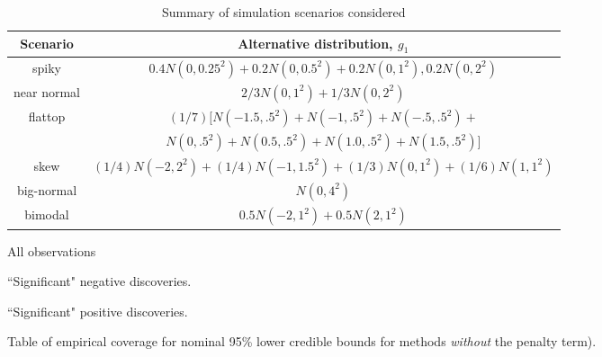 \documentclass[11pt]{article}
\begin{document}
\begin{table}[!ht]
\centering\begin{tabular}{c c } \toprule
Scenario & Alternative distribution, $g_1$  \\ \midrule
spiky & $0.4 N(0,0.25^2) + 0.2 N(0,0.5^2) + 0.2 N(0,1^2), 0.2 N(0,2^2) $\\
near normal & $2/3 N(0,1^2) + 1/3 N(0,2^2)$ \\
flattop& $(1/7) [N(-1.5,.5^2) + N(-1,.5^2) + N(-.5,.5^2) +$ \\
 &  $N(0,.5^2) +N(0.5,.5^2)  +N(1.0,.5^2) + N(1.5,.5^2)]$  \\
skew & $(1/4) N(-2,2^2) + (1/4) N(-1,1.5^2) +  (1/3) N(0,1^2) + (1/6) N(1,1^2) $\\
big-normal & $N(0,4^2)$ \\ 
bimodal & $0.5 N(-2,1^2) + 0.5 N(2,1^2)$ \\ \bottomrule
\end{tabular}
\caption{Summary of simulation scenarios considered} \label{table:scenarios}
\end{table}


\begin{table}[!ht]
\begin{subtable}{\textwidth}
	\centering
	\caption{All observations}
\end{subtable}

\begin{subtable}{\textwidth}
\centering
\caption{``Significant" negative discoveries.}
\end{subtable}

\begin{subtable}{\textwidth}
\centering
\caption{``Significant" positive discoveries.}
\end{subtable}

\caption{Table of empirical coverage for nominal 95\% lower credible bounds for methods {\it without} the penalty term). } \label{tab:nopen}
\end{table}


\end{document}
